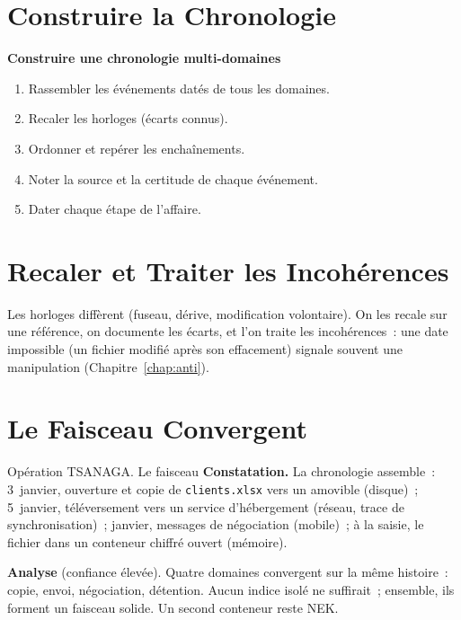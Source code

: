 \separateur

\section{Construire la Chronologie}
\label{sec:c17-chrono}

\begin{boxprocedure}
\textbf{Construire une chronologie multi-domaines}
\begin{enumerate}
    \item Rassembler les événements datés de tous les domaines.
    \item Recaler les horloges (écarts connus).
    \item Ordonner et repérer les enchaînements.
    \item Noter la source et la certitude de chaque événement.
    \item Dater chaque étape de l'affaire.
\end{enumerate}
\end{boxprocedure}

\section{Recaler et Traiter les Incohérences}
\label{sec:c17-recaler}

Les horloges diffèrent (fuseau, dérive, modification volontaire). On les
recale sur une référence, on documente les écarts, et l'on traite les
incohérences~: une date impossible (un fichier modifié après son effacement)
signale souvent une manipulation (Chapitre~\ref{chap:anti}).

\section{Le Faisceau Convergent}
\label{sec:c17-faisceau}

\begin{boxscenario}{Opération TSANAGA. Le faisceau}
\textbf{Constatation.} La chronologie assemble~: 3~janvier, ouverture et copie
de \texttt{clients.xlsx} vers un amovible (disque)~; 5~janvier, téléversement
vers un service d'hébergement (réseau, trace de synchronisation)~; janvier,
messages de négociation (mobile)~; à la saisie, le fichier dans un conteneur
chiffré ouvert (mémoire).

\medskip
\textbf{Analyse} (confiance élevée). Quatre domaines convergent sur la même
histoire~: copie, envoi, négociation, détention. Aucun indice isolé ne
suffirait~; ensemble, ils forment un faisceau solide. Un second conteneur
reste NEK.
\end{boxscenario}

